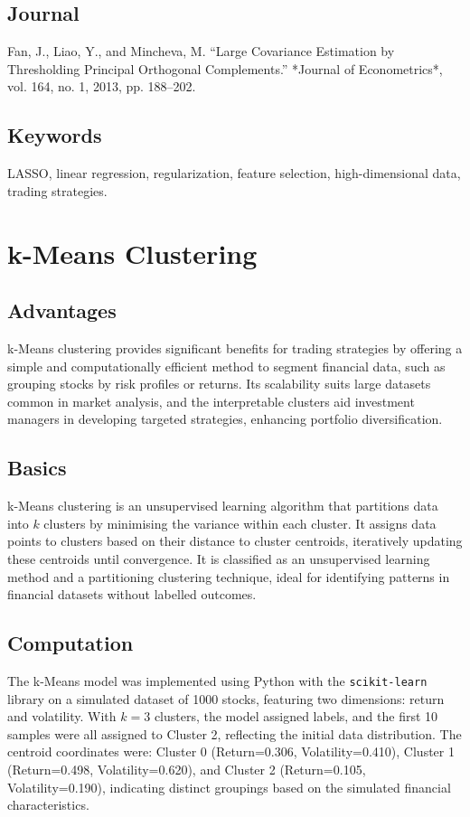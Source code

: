 \documentclass{article}
\begin{document}
\subsection{Journal}
Fan, J., Liao, Y., and Mincheva, M. “Large Covariance Estimation by Thresholding Principal Orthogonal Complements.” *Journal of Econometrics*, vol. 164, no. 1, 2013, pp. 188–202.

\subsection{Keywords}
LASSO, linear regression, regularization, feature selection, high-dimensional data, trading strategies.

\section{k-Means Clustering}
\label{sec:kmeans}

\subsection{Advantages}
k-Means clustering provides significant benefits for trading strategies by offering a simple and computationally efficient method to segment financial data, such as grouping stocks by risk profiles or returns. Its scalability suits large datasets common in market analysis, and the interpretable clusters aid investment managers in developing targeted strategies, enhancing portfolio diversification.

\subsection{Basics}
k-Means clustering is an unsupervised learning algorithm that partitions data into \(k\) clusters by minimising the variance within each cluster. It assigns data points to clusters based on their distance to cluster centroids, iteratively updating these centroids until convergence. It is classified as an unsupervised learning method and a partitioning clustering technique, ideal for identifying patterns in financial datasets without labelled outcomes.

\subsection{Computation}
The k-Means model was implemented using Python with the \texttt{scikit-learn} library on a simulated dataset of 1000 stocks, featuring two dimensions: return and volatility. With \(k=3\) clusters, the model assigned labels, and the first 10 samples were all assigned to Cluster 2, reflecting the initial data distribution. The centroid coordinates were: Cluster 0 (Return=0.306, Volatility=0.410), Cluster 1 (Return=0.498, Volatility=0.620), and Cluster 2 (Return=0.105, Volatility=0.190), indicating distinct groupings based on the simulated financial characteristics.
\end{document}
